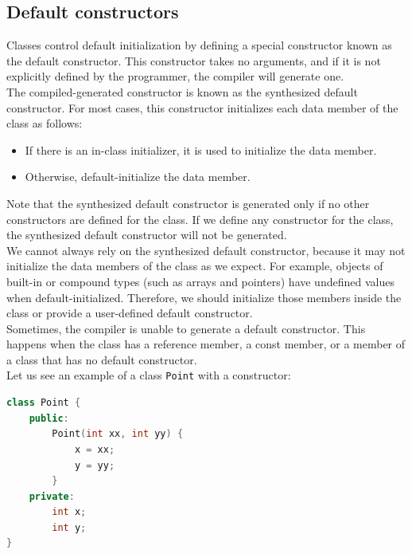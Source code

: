 \subsection{Default constructors}

Classes control default initialization by defining a special constructor known as the
default constructor. This constructor takes no arguments, and if it is not explicitly defined
by the programmer, the compiler will generate one.\\

The compiled-generated constructor is known as the synthesized default constructor. For most cases,
this constructor initializes each data member of the class as follows:

\begin{itemize}
    \item If there is an in-class initializer, it is used to initialize the data member.
    \item Otherwise, default-initialize the data member.
\end{itemize}

Note that the synthesized default constructor is generated only if no other constructors are
defined for the class. If we define any constructor for the class, the synthesized default
constructor will not be generated.\\

We cannot always rely on the synthesized default constructor, because it may not initialize
the data members of the class as we expect. For example, objects of built-in or compound types
(such as arrays and pointers) have undefined values when default-initialized. Therefore, we should
initialize those members inside the class or provide a user-defined default constructor.\\

Sometimes, the compiler is unable to generate a default constructor. This happens when the class
has a reference member, a const member, or a member of a class that has no default constructor.\\

Let us see an example of a class \texttt{Point} with a constructor:\\

\begin{lstlisting}[language=C++]
class Point {
    public:
        Point(int xx, int yy) {
            x = xx;
            y = yy;
        }
    private:
        int x;
        int y;
}
\end{lstlisting}

